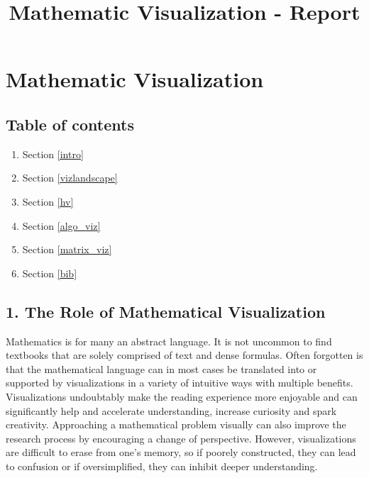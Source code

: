 \documentclass[11pt]{article}
\title{Mathematic Visualization - Report}
\providecommand{\tightlist}{%
      \setlength{\itemsep}{0pt}\setlength{\parskip}{0pt}}
\begin{document}
    
    
    \maketitle
    
    

    
    \section{Mathematic Visualization}\label{mathematic-visualization}

\subsection{Table of contents}\label{table-of-contents}

\begin{enumerate}
\def\labelenumi{\arabic{enumi}.}
\tightlist
\item
  Section \ref{intro}
\item
  Section \ref{vizlandscape}
\item
  Section \ref{hv}
\item
  Section \ref{algo_viz}
\item
  Section \ref{matrix_viz}
\item
  Section \ref{bib}
\end{enumerate}

    \subsection{1. The Role of Mathematical Visualization
}\label{the-role-of-mathematical-visualization}

Mathematics is for many an abstract language. It is not uncommon to find
textbooks that are solely comprised of text and dense formulas. Often
forgotten is that the mathematical language can in most cases be
translated into or supported by visualizations in a variety of intuitive
ways with multiple benefits. Visualizations undoubtably make the reading
experience more enjoyable and can significantly help and accelerate
understanding, increase curiosity and spark creativity. Approaching a
mathematical problem visually can also improve the research process by
encouraging a change of perspective. However, visualizations are
difficult to erase from one's memory, so if poorely constructed, they
can lead to confusion or if oversimplified, they can inhibit deeper
understanding.
\end{document}
